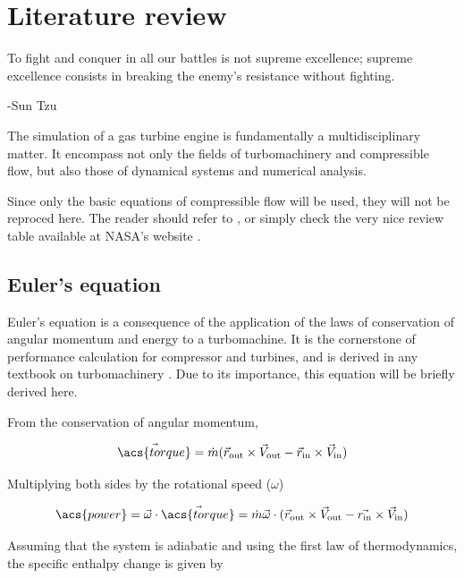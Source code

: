 \documentclass[tcc]{subfiles}
\begin{document}
\textual



\chapter{Literature review}
\epigraph{To fight and conquer in all our battles is not supreme excellence; supreme excellence consists in breaking the enemy's resistance without fighting.}{-Sun Tzu}

The simulation of a gas turbine engine is fundamentally a multidisciplinary matter.
It encompass not only the fields of turbomachinery and compressible flow, 
but also those of dynamical systems and numerical analysis.

Since only the basic equations of compressible flow will be used, they will not be reproced here. The reader should refer to \textcite{Anderson, Shapiro}, or simply check the very nice review table available at NASA's website \cite{nasa_isentropic}.

\section{Euler's equation}
\label{sec:euler_equation}
Euler's equation is a consequence of the application of the laws of conservation of angular momentum and energy to a turbomachine. It is the cornerstone of performance calculation for compressor and turbines, and is derived in any textbook on turbomachinery \cite{Lakshminarayana1996, Dixon1998, Schobeiri2004, Hill1991, Logan2003, Baskharone2006}. Due to its importance, this equation will be briefly derived here.

From the conservation of angular momentum, 

\begin{equation}
    \vec{\acs{torque}} = \dot{m} (\vec{r}_{\text{out}}\cross\vec{V}_{\text{out}} - \vec{r}_{\text{in}}\cross\vec{V}_{\text{in}}) 
\end{equation}

Multiplying both sides by the rotational speed ($\omega$)

\begin{equation}
    \acs{power} = \vec{\omega}\cdot\vec{\acs{torque}} 
                = \dot{m} \vec{\omega} \cdot (\vec{r}_{\text{out}}\cross\vec{V}_{\text{out}} - \vec{r_{\text{in}}}\cross\vec{V}_{\text{in}}) 
\end{equation}

Assuming that the system is adiabatic and using the first law of thermodynamics, the specific enthalpy change is given by
\end{document}
